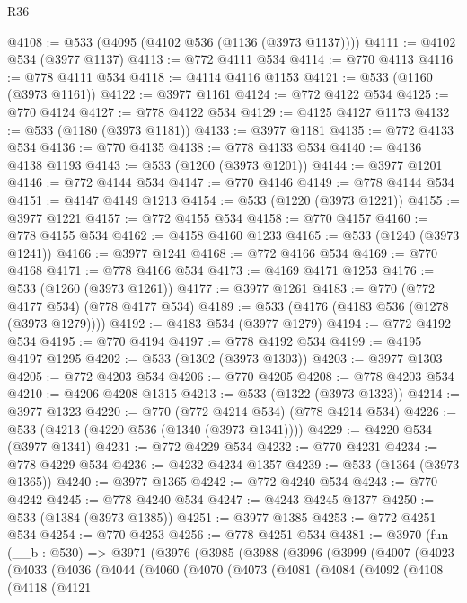 \begin{lexlean}{R36}
\begin{coremodule}
@4108 := @533 (@4095 (@4102 @536 (@1136 (@3973 @1137))))
@4111 := @4102 @534 (@3977 @1137)
@4113 := @772 @4111 @534
@4114 := @770 @4113
@4116 := @778 @4111 @534
@4118 := @4114 @4116 @1153
@4121 := @533 (@1160 (@3973 @1161))
@4122 := @3977 @1161
@4124 := @772 @4122 @534
@4125 := @770 @4124
@4127 := @778 @4122 @534
@4129 := @4125 @4127 @1173
@4132 := @533 (@1180 (@3973 @1181))
@4133 := @3977 @1181
@4135 := @772 @4133 @534
@4136 := @770 @4135
@4138 := @778 @4133 @534
@4140 := @4136 @4138 @1193
@4143 := @533 (@1200 (@3973 @1201))
@4144 := @3977 @1201
@4146 := @772 @4144 @534
@4147 := @770 @4146
@4149 := @778 @4144 @534
@4151 := @4147 @4149 @1213
@4154 := @533 (@1220 (@3973 @1221))
@4155 := @3977 @1221
@4157 := @772 @4155 @534
@4158 := @770 @4157
@4160 := @778 @4155 @534
@4162 := @4158 @4160 @1233
@4165 := @533 (@1240 (@3973 @1241))
@4166 := @3977 @1241
@4168 := @772 @4166 @534
@4169 := @770 @4168
@4171 := @778 @4166 @534
@4173 := @4169 @4171 @1253
@4176 := @533 (@1260 (@3973 @1261))
@4177 := @3977 @1261
@4183 := @770 (@772 @4177 @534) (@778 @4177 @534)
@4189 := @533 (@4176 (@4183 @536 (@1278 (@3973 @1279))))
@4192 := @4183 @534 (@3977 @1279)
@4194 := @772 @4192 @534
@4195 := @770 @4194
@4197 := @778 @4192 @534
@4199 := @4195 @4197 @1295
@4202 := @533 (@1302 (@3973 @1303))
@4203 := @3977 @1303
@4205 := @772 @4203 @534
@4206 := @770 @4205
@4208 := @778 @4203 @534
@4210 := @4206 @4208 @1315
@4213 := @533 (@1322 (@3973 @1323))
@4214 := @3977 @1323
@4220 := @770 (@772 @4214 @534) (@778 @4214 @534)
@4226 := @533 (@4213 (@4220 @536 (@1340 (@3973 @1341))))
@4229 := @4220 @534 (@3977 @1341)
@4231 := @772 @4229 @534
@4232 := @770 @4231
@4234 := @778 @4229 @534
@4236 := @4232 @4234 @1357
@4239 := @533 (@1364 (@3973 @1365))
@4240 := @3977 @1365
@4242 := @772 @4240 @534
@4243 := @770 @4242
@4245 := @778 @4240 @534
@4247 := @4243 @4245 @1377
@4250 := @533 (@1384 (@3973 @1385))
@4251 := @3977 @1385
@4253 := @772 @4251 @534
@4254 := @770 @4253
@4256 := @778 @4251 @534
@4381 := @3970
    (fun (__b : @530) =>
    @3971
      (@3976
        (@3985
          (@3988
            (@3996
              (@3999
                (@4007
                  (@4023
                    (@4033
                      (@4036
                        (@4044
                          (@4060
                            (@4070
                              (@4073
                                (@4081
                                  (@4084
                                    (@4092
                                      (@4108
                                        (@4118
                                          (@4121

\end{coremodule}
\end{lexlean}
